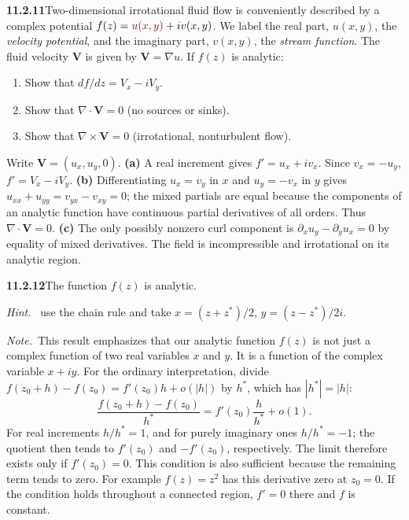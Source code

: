 \par\bigskip
\noindent\textbf{11.2.11}\quad Two-dimensional irrotational fluid flow is
conveniently described by a complex potential $f(z)=\erratum{u(x,y)}+iv(x,y)$. We label
the real part, $u(x,y)$, the \emph{velocity potential}, and the imaginary
part, $v(x,y)$, the \emph{stream function}. The fluid velocity $\mathbf{V}$ is
given by $\mathbf{V}=\nabla u$. If $f(z)$ is analytic:
\begin{enumerate}
\item[(a)] Show that $df/dz=V_{x}-iV_{y}$.
\item[(b)] Show that $\nabla\cdot\mathbf{V}=0$ (no sources or sinks).
\item[(c)] Show that $\nabla\times\mathbf{V}=0$ (irrotational, nonturbulent
  flow).
\end{enumerate}
\solution
Write $\mathbf V=(u_x,u_y,0)$.
\textbf{(a)} A real increment gives $f'=u_x+iv_x$.
Since $v_x=-u_y$, $\boxed{f'=V_x-iV_y}$.
\textbf{(b)} Differentiating $u_x=v_y$ in $x$ and
$u_y=-v_x$ in $y$ gives
$u_{xx}+u_{yy}=v_{yx}-v_{xy}=0$; the mixed partials are equal because
the components of an analytic function have continuous partial
derivatives of all orders. Thus $\nabla\cdot\mathbf V=0$.
\textbf{(c)} The only possibly nonzero curl component is
$\partial_xu_y-\partial_yu_x=0$ by equality of mixed derivatives.
The field is incompressible and irrotational on its analytic region.

\par\bigskip
\noindent\textbf{11.2.12}\quad The function $f(z)$ is analytic.

\emph{Hint.}~ use the chain rule and take $x=(z+z^{*})/2$, $y=(z-z^{*})/2i$.

\emph{Note.}~This result emphasizes that our analytic function $f(z)$ is not
just a complex function of two real variables $x$ and $y$. It is a function of
the complex variable $x+iy$.
\solution
{}
For the ordinary interpretation, divide
$f(z_0+h)-f(z_0)=f'(z_0)h+o(|h|)$ by $h^*$, which has
$|h^*|=|h|$:
\[
\frac{f(z_0+h)-f(z_0)}{h^*}
=f'(z_0)\frac h{h^*}+o(1).
\]
For real increments $h/h^*=1$, and for purely imaginary ones
$h/h^*=-1$; the quotient then tends to $f'(z_0)$ and
$-f'(z_0)$, respectively. The limit therefore exists only if $f'(z_0)=0$.
This condition is also sufficient because the remaining term tends
to zero. For example $f(z)=z^2$ has this derivative zero at $z_0=0$.
If the condition holds throughout a connected region, $f'=0$
there and $f$ is constant.

